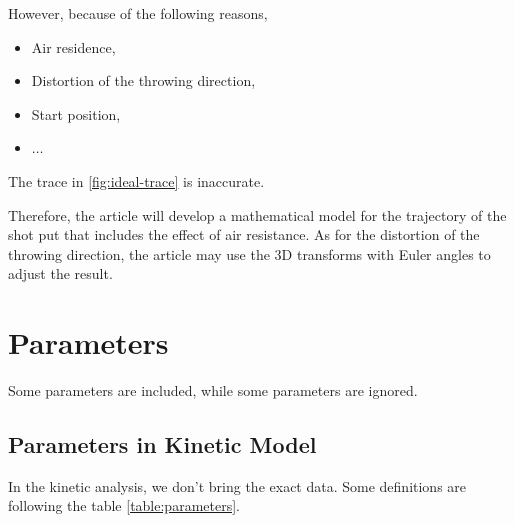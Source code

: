 \documentclass{article}
\begin{document}
However, because of the following reasons,

\begin{itemize}
    \item Air residence,
    \item Distortion of the throwing direction,
    \item Start position,
    \item $\dots$
\end{itemize}

The trace in \ref{fig:ideal-trace} is inaccurate.

Therefore, the article will develop a mathematical model for the trajectory of the shot put that includes the effect of air resistance. As for the distortion of the throwing direction, the article may use the 3D transforms with Euler angles to adjust the result.

\section{Parameters}

Some parameters are included, while some parameters are ignored.

\subsection{Parameters in Kinetic Model}

In the kinetic analysis, we don't bring the exact data. Some definitions are following the table \ref{table:parameters}.
\end{document}
